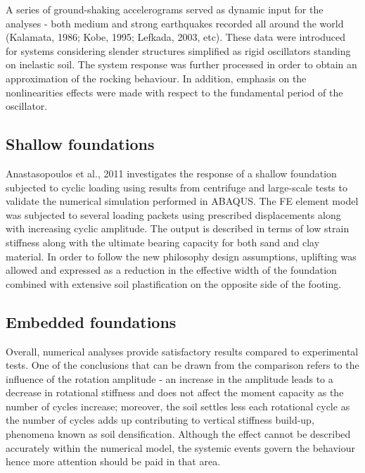 \documentclass[12pt,a4paper]{report}
\begin{document}
A series of ground-shaking accelerograms served as dynamic input for the analyses - both medium and strong earthquakes recorded all around the world (Kalamata, 1986; Kobe, 1995; Lefkada, 2003, etc). These data were introduced for systems considering slender structures simplified as rigid oscillators standing on inelastic soil. The system response was further processed in order to obtain an approximation of the rocking behaviour. In addition, emphasis on the nonlinearities effects were made with respect to the fundamental period of the oscillator.

\subsection{Shallow foundations}Anastasopoulos et al., 2011 \cite{anastasopoulos2011simplified} investigates the response of a shallow foundation subjected to cyclic loading using results from centrifuge and large-scale tests to validate the numerical simulation performed in ABAQUS. The FE element model was subjected to several loading packets using prescribed displacements along with increasing cyclic amplitude. The output is described in terms of low strain stiffness along with the ultimate bearing capacity for both sand and clay material. In order to follow the new philosophy design assumptions, uplifting was allowed and expressed as a reduction in the effective width of the foundation combined with extensive soil plastification on the opposite side of the footing.

\subsection{Embedded foundations}
Overall, numerical analyses provide satisfactory results compared to experimental tests. One of the conclusions that can be drawn from the comparison refers to the influence of the rotation amplitude - an increase in the amplitude leads to a decrease in rotational stiffness and does not affect the moment capacity as the number of cycles increase; moreover, the soil settles less each rotational cycle as the number of cycles adds up contributing to vertical stiffness build-up, phenomena known as soil densification. Although the effect cannot be described accurately within the numerical model, the systemic events govern the behaviour hence more attention should be paid in that area.
\end{document}
